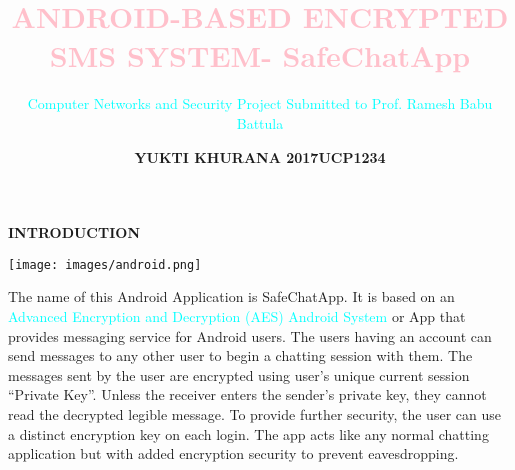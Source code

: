 \documentclass{beamer}
\begin{document}
\vspace{-2cm} 
\title{\textbf{\textcolor{pink}{ANDROID-BASED ENCRYPTED SMS SYSTEM- SafeChatApp}}}
\subtitle{\textcolor {cyan}{Computer Networks and Security Project \linebreak Submitted to Prof. Ramesh Babu Battula}}
\author{\textbf{YUKTI KHURANA \linebreak 2017UCP1234}}
\institute{\textbf{\textcolor{byzantium}{Malaviya National Institute Of Technology, Jaipur}}}
\date{}
\begin{frame}
\titlepage
\end{frame}





\begin{frame}
\begin{tcolorbox}
\begin{center}
\textsc{\textbf{\textcolor{byzantium}{INTRODUCTION}}}
\end{center}
\end{tcolorbox}
\begin{center}
\texttt{[image: images/android.png]}
\end{center}

\begin{flushleft}
The name of this Android Application is SafeChatApp. It is based on an \textcolor{cyan} {Advanced Encryption and Decryption (AES) Android System }or App that provides messaging service for Android users. The users having an account can send messages to any other user to begin a chatting session with them. 
The messages sent by the user are encrypted  using user’s unique current session “Private Key”. Unless the receiver enters the sender’s private key, they cannot read the decrypted legible message. To provide further security, the user can use a distinct encryption key on each login. The app acts like any normal chatting application but with added encryption security to prevent eavesdropping.
\end{flushleft}
\end{frame}
\end{document}
